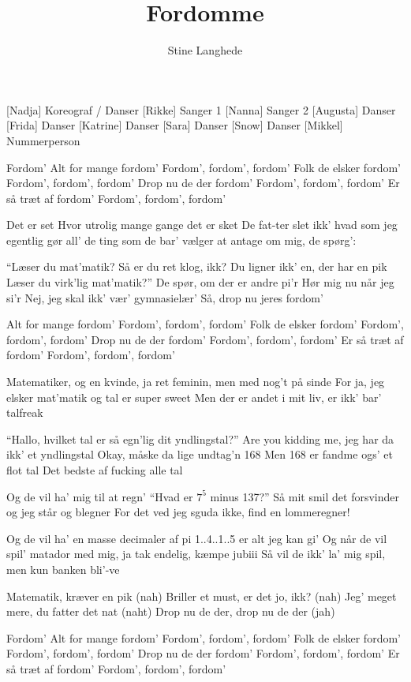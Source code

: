 \documentclass[a4paper,11pt]{article}
\title{Fordomme}
\author{Stine Langhede}
\begin{document}
\maketitle

\begin{roles}
[Nadja] Koreograf / Danser
[Rikke] Sanger 1
[Nanna] Sanger 2
[Augusta] Danser
[Frida] Danser
[Katrine] Danser
[Sara] Danser
[Snow] Danser
[Mikkel] Nummerperson
\end{roles}

\begin{song}
%
Fordom'
Alt for mange fordom'
Fordom', fordom', fordom'
Folk de elsker fordom'
Fordom', fordom', fordom'
Drop nu de der fordom'
Fordom', fordom', fordom'
Er så træt af fordom'
Fordom', fordom', fordom'

%
Det er set
Hvor utrolig mange gange det er sket
De fat-ter slet ikk' hvad som jeg egentlig gør
all' de ting som de bar' vælger at antage om mig, de spørg':

``Læser du mat'matik?
Så er du ret klog, ikk?
Du ligner ikk' en, der har en pik
Læser du virk'lig mat'matik?''
De spør, om der er andre pi'r
Hør mig nu når jeg si'r
Nej, jeg skal ikk' vær' gymnasielær'
Så, drop nu jeres fordom'

%
Alt for mange fordom'
Fordom', fordom', fordom'
Folk de elsker fordom'
Fordom', fordom', fordom'
Drop nu de der fordom'
Fordom', fordom', fordom'
Er så træt af fordom'
Fordom', fordom', fordom'

%
Matematiker, og en kvinde,
ja ret feminin, men med nog't på sinde
For ja, jeg elsker mat'matik og tal er super sweet
Men der er andet i mit liv, er ikk' bar' talfreak

``Hallo, hvilket tal er så egn'lig dit yndlingstal?''
Are you kidding me, jeg har da ikk' et yndlingstal
Okay, måske da lige undtag'n 168
Men 168 er fandme ogs' et flot tal
Det bedste af fucking alle tal

Og de vil ha' mig til at regn'
``Hvad er $7^5$ minus 137?''
Så mit smil det forsvinder og jeg står og blegner
For det ved jeg sguda ikke, find en lommeregner!

Og de vil ha' en masse decimaler af pi
1..4..1..5 er alt jeg kan gi'
Og når de vil spil' matador med mig, ja tak endelig, kæmpe jubiii
Så vil de ikk' la' mig spil, men kun banken bli'-ve

Matematik, kræver en pik (nah)
Briller et must, er det jo, ikk? (nah)
Jeg' meget mere, du fatter det nat (naht)
Drop nu de der, drop nu de der (jah)

%
Fordom'
Alt for mange fordom'
Fordom', fordom', fordom'
Folk de elsker fordom'
Fordom', fordom', fordom'
Drop nu de der fordom'
Fordom', fordom', fordom'
Er så træt af fordom'
Fordom', fordom', fordom'
\end{song}
\end{document}
